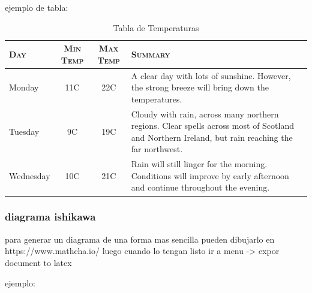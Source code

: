 ejemplo de tabla:

\begin{table}[h!]
    \caption[Ejemplo: Tabla de Temperaturas]{Tabla de Temperaturas}
    \label{tbl:temperaturas}
    \begin{tabularx}{\linewidth}{@{} l  c  c  X @{}}
        \toprule
        \textbf{\textsc{Day}} &  \textbf{\textsc{Min Temp}} 
        & \textbf{\textsc{Max Temp}} & \textbf{\textsc{Summary}}\\
        \hline\hline
        Monday & 11C & 22C & A clear day with lots of sunshine.
        However, the strong breeze will bring down the temperatures. \\ \hline
        Tuesday & 9C & 19C & Cloudy with rain, across many northern regions. Clear spells
        across most of Scotland and Northern Ireland,
        but rain reaching the far northwest. \\ \hline
        Wednesday & 10C & 21C & Rain will still linger for the morning.
        Conditions will improve by early afternoon and continue
        throughout the evening. \\
        \bottomrule
    \end{tabularx}
\end{table}

\subsubsection{diagrama ishikawa}
para generar un diagrama de una forma mas sencilla pueden dibujarlo en https://www.mathcha.io/ luego cuando lo tengan listo ir a menu -> expor document to latex

ejemplo:

